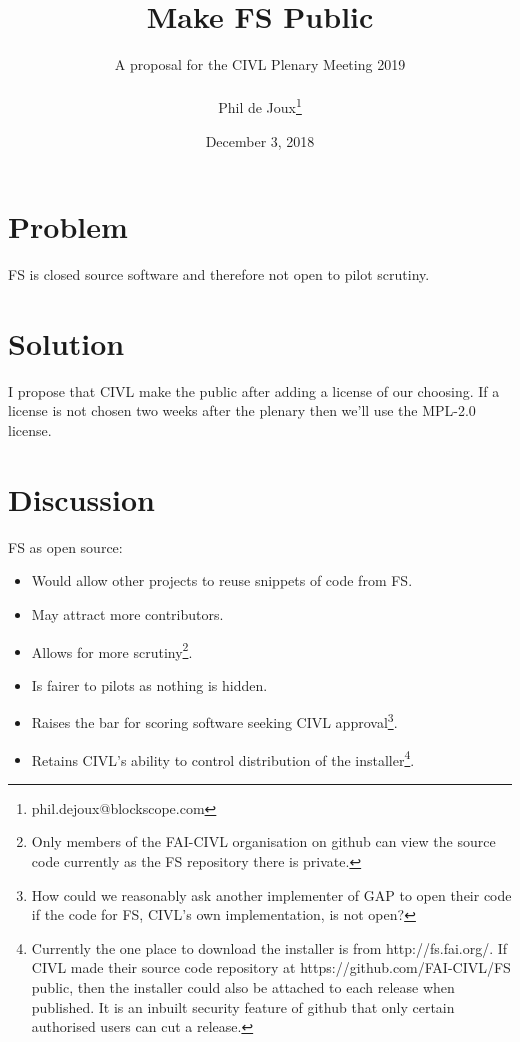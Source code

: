 \documentclass{article}
\title{Make FS Public}
\date{December 3, 2018}
\author{A proposal for the CIVL Plenary Meeting 2019\\\\
Phil de Joux\thanks{phil.dejoux@blockscope.com}}
\begin{document}
\maketitle
\section*{Problem}
FS is closed source software and therefore not open to pilot scrutiny.

\section*{Solution}
I propose that CIVL make the  public after adding a license of our choosing. If a license is not
chosen two weeks after the plenary then we'll use the MPL-2.0 license.

\section*{Discussion}
FS as open source:\\
\begin{itemize}
    \item Would allow other projects to reuse snippets of code from FS.
    \item May attract more contributors.
    \item Allows for more scrutiny\footnote{Only members of the FAI-CIVL
    organisation on github can view the source code currently as the FS
    repository there is private.}.
    \item Is fairer to pilots as nothing is hidden.
    \item Raises the bar for scoring software seeking CIVL
    approval\footnote{How could we reasonably ask another implementer of GAP to
    open their code if the code for FS, CIVL's own implementation, is not
    open?}.
    \item Retains CIVL's ability to control distribution of the
    installer\footnote{Currently the one place to download the installer is
    from http://fs.fai.org/. If CIVL made their source code repository at
    https://github.com/FAI-CIVL/FS public, then the installer could also be
    attached to each release when published. It is an inbuilt security feature
    of github that only certain authorised users can cut a release.}.
\end{itemize}
\end{document}
